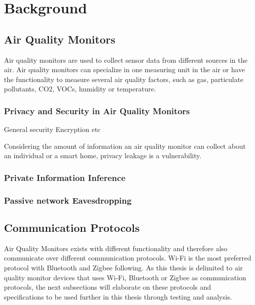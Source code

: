 \chapter*{Background}

\section*{Air Quality Monitors}
Air quality monitors are used to collect sensor data from different sources in the air. \cite{GeneralAirQualityMonitor} Air quality monitors can specialize in one measuring unit in the air or have the functionality to measure several air quality factors, such as gas, particulate pollutants, CO2, VOCs, humidity or temperature. 

\subsection*{Privacy and Security in Air Quality Monitors}
General security 
Encryption etc

Considering the amount of information an air quality monitor can collect about an individual or a smart home, privacy leakage is a vulnerability. \cite{SecPrivSmartCity} 


\subsection*{Private Information Inference}


\subsection*{Passive network Eavesdropping}

\section*{Communication Protocols}
Air Quality Monitors exists with different functionality and therefore also communicate over different communication protocols. Wi-Fi is the most preferred protocol with Bluetooth and Zigbee following. \cite{saini2020indoor} As this thesis is delimited to air quality monitor devices that uses Wi-Fi, Bluetooth or Zigbee as communication protocols, the next subsections will elaborate on these protocols and specifications to be used further in this thesis through testing and analysis. 

